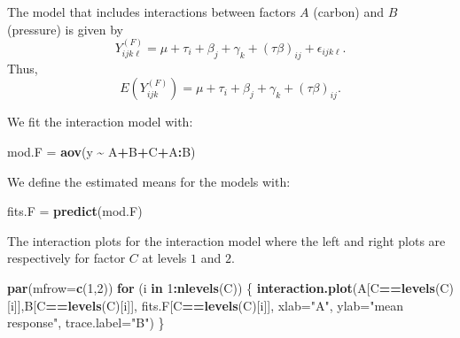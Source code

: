 \documentclass[
  11pt,
]{article}
\newenvironment{Shaded}{\begin{snugshade}}{\end{snugshade}}
\newcommand{\AttributeTok}[1]{\textcolor[rgb]{0.13,0.29,0.53}{#1}}
\newcommand{\ControlFlowTok}[1]{\textcolor[rgb]{0.13,0.29,0.53}{\textbf{#1}}}
\newcommand{\DecValTok}[1]{\textcolor[rgb]{0.00,0.00,0.81}{#1}}
\newcommand{\FunctionTok}[1]{\textcolor[rgb]{0.13,0.29,0.53}{\textbf{#1}}}
\newcommand{\NormalTok}[1]{#1}
\newcommand{\OtherTok}[1]{\textcolor[rgb]{0.56,0.35,0.01}{#1}}
\newcommand{\SpecialCharTok}[1]{\textcolor[rgb]{0.81,0.36,0.00}{\textbf{#1}}}
\newcommand{\StringTok}[1]{\textcolor[rgb]{0.31,0.60,0.02}{#1}}
\begin{document}
The model that includes interactions between factors \(A\) (carbon) and
\(B\) (pressure) is given by \[
  Y_{i j k \ell}^{(F)} = \mu + \tau_i + \beta_j + \gamma_k +
                   (\tau\!\beta)_{i j} + \epsilon_{i j k \ell}.
\] Thus, \[
  E(Y_{i j k}^{(F)}) = \mu + \tau_i + \beta_j + \gamma_k + (\tau\!\beta)_{i j}.
\]

We fit the interaction model with:

\begin{Shaded}
\begin{Highlighting}[]
\NormalTok{mod.F }\OtherTok{=} \FunctionTok{aov}\NormalTok{(y }\SpecialCharTok{\textasciitilde{}}\NormalTok{ A}\SpecialCharTok{+}\NormalTok{B}\SpecialCharTok{+}\NormalTok{C}\SpecialCharTok{+}\NormalTok{A}\SpecialCharTok{:}\NormalTok{B)}
\end{Highlighting}
\end{Shaded}

We define the estimated means for the models with:

\begin{Shaded}
\begin{Highlighting}[]
\NormalTok{fits.F }\OtherTok{=} \FunctionTok{predict}\NormalTok{(mod.F)}
\end{Highlighting}
\end{Shaded}

The interaction plots for the interaction model where the left and right
plots are respectively for factor \(C\) at levels \(1\) and \(2\).

\begin{Shaded}
\begin{Highlighting}[]
\FunctionTok{par}\NormalTok{(}\AttributeTok{mfrow=}\FunctionTok{c}\NormalTok{(}\DecValTok{1}\NormalTok{,}\DecValTok{2}\NormalTok{))}
\ControlFlowTok{for}\NormalTok{ (i }\ControlFlowTok{in} \DecValTok{1}\SpecialCharTok{:}\FunctionTok{nlevels}\NormalTok{(C))}
\NormalTok{\{}
  \FunctionTok{interaction.plot}\NormalTok{(A[C}\SpecialCharTok{==}\FunctionTok{levels}\NormalTok{(C)[i]],B[C}\SpecialCharTok{==}\FunctionTok{levels}\NormalTok{(C)[i]],}
\NormalTok{                   fits.F[C}\SpecialCharTok{==}\FunctionTok{levels}\NormalTok{(C)[i]],}
                   \AttributeTok{xlab=}\StringTok{"A"}\NormalTok{,}
                   \AttributeTok{ylab=}\StringTok{"mean response"}\NormalTok{,}
                   \AttributeTok{trace.label=}\StringTok{"B"}\NormalTok{)}
\NormalTok{\}}
\end{Highlighting}
\end{Shaded}
\end{document}
